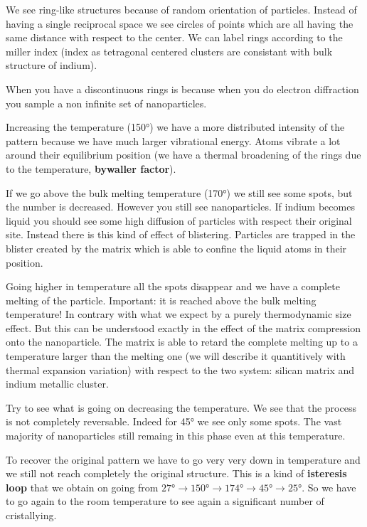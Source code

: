 \documentclass[../main/main.tex]{subfiles}
\begin{document}
We see ring-like structures because of random orientation of particles. Instead of having a single reciprocal space we see circles of points which are all having the same distance with respect to the center. We can label rings according to the miller index (index as tetragonal centered clusters are consistant with bulk structure of indium).

When you have a discontinuous rings is because when you do electron diffraction you sample a non infinite set of nanoparticles.

Increasing the temperature (150°) we have a more distributed intensity of the pattern because we have much larger vibrational energy. Atoms vibrate a lot around their equilibrium position (we have a thermal broadening of the rings due to the temperature, \textbf{bywaller factor}).

If we go above the bulk melting temperature (170°) we still see some spots, but the number is decreased. However you still see nanoparticles.
If indium becomes liquid you should see some high diffusion of particles with respect their original site. Instead there is this kind of effect of blistering. Particles are trapped in the blister created by the matrix which is able to confine the liquid atoms in their position.

Going higher in temperature all the spots disappear and we have a complete melting of the particle.
Important: it is reached above the bulk melting temperature!
In contrary with what we expect by a purely thermodynamic size effect. But this can be understood exactly in the effect of the matrix compression onto the nanoparticle.
The matrix is able to retard the complete melting up to a temperature larger than the melting one (we will describe it quantitively with thermal expansion variation) with respect to the two system: silican matrix and indium metallic cluster.

Try to see what is going on decreasing the temperature. We see that the process is not completely reversable. Indeed for 45° we see only some spots. The vast majority of nanoparticles still remaing in this phase even at this temperature.

To recover the original pattern we have to go very very down in temperature and we still not reach completely the original structure.
This is a kind of \textbf{isteresis loop} that we obtain on going from \( 27° \rightarrow 150° \rightarrow 174° \rightarrow 45° \rightarrow 25°\).  So we have to go again to the room temperature to see again a significant number of cristallying.
\end{document}
